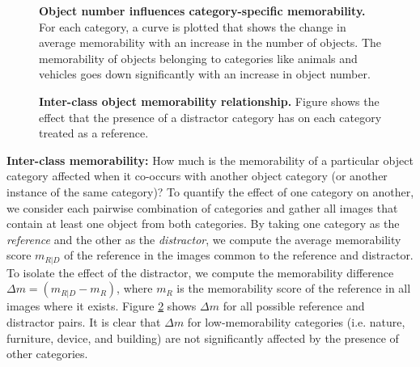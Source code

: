 \begin{figure}[t]
\centering
{}
\vspace{-5mm}\caption{\footnotesize\textbf{Object number influences category-specific memorability.} For each category, a curve is plotted that shows the change in average memorability with an increase in the number of objects. The memorability of objects belonging to categories like animals and vehicles goes down significantly with an increase in object number.}\label{fig:obLabelChange}
\end{figure}

\begin{figure}[b]
\centering
{}
\vspace{-5mm}\caption{\footnotesize\textbf{Inter-class object memorability relationship.} Figure shows the effect that the presence of a distractor category has on each category treated as a reference. }\label{fig:obLabelPair}
\end{figure}

\noindent\textbf{Inter-class memorability:} How much is the memorability of a particular object category affected when it co-occurs with another object category (or another instance of the same category)? To quantify the effect of one category on another, we consider each pairwise combination of categories and gather all images that contain at least one object from both categories. By taking one category as the \emph{reference} and the other as the \emph{distractor}, we compute the average memorability score $m_{R|D}$ of the reference in the  images common to the reference and distractor. To isolate the effect of the distractor, we compute the memorability difference $\Delta m=(m_{R|D}-m_R)$, where $m_R$ is the memorability score of the reference in all images where it exists. Figure \ref{fig:obLabelPair} shows $\Delta m$ for all possible reference and distractor pairs. It is clear that  $\Delta m$ for low-memorability categories (i.e. nature, furniture, device, and building) are not significantly affected by the presence of other categories. %


